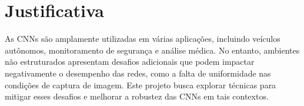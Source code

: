 \section{Justificativa}
As CNNs são amplamente utilizadas em várias aplicações, incluindo veículos autônomos, monitoramento de segurança e análise médica. No entanto, ambientes não estruturados apresentam desafios adicionais que podem impactar negativamente o desempenho das redes, como a falta de uniformidade nas condições de captura de imagem. Este projeto busca explorar técnicas para mitigar esses desafios e melhorar a robustez das CNNs em tais contextos.